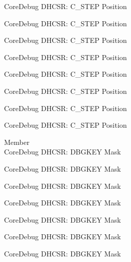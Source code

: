 \begin{DoxyRefList}
\label{deprecated__deprecated000694}%
%
Core\+Debug DHCSR\+: C\+\_\+\+STEP Position 

\label{deprecated__deprecated000782}%
%
Core\+Debug DHCSR\+: C\+\_\+\+STEP Position 

\label{deprecated__deprecated000838}%
%
Core\+Debug DHCSR\+: C\+\_\+\+STEP Position 

\label{deprecated__deprecated000921}%
%
Core\+Debug DHCSR\+: C\+\_\+\+STEP Position 

\label{deprecated__deprecated000980}%
%
Core\+Debug DHCSR\+: C\+\_\+\+STEP Position 

\label{deprecated__deprecated001056}%
%
Core\+Debug DHCSR\+: C\+\_\+\+STEP Position 

\label{deprecated__deprecated001145}%
%
Core\+Debug DHCSR\+: C\+\_\+\+STEP Position 

\label{deprecated__deprecated001247}%
%
Core\+Debug DHCSR\+: C\+\_\+\+STEP Position  
\item[Member \doxylink{group___c_m_s_i_s___core_debug_ga1ce997cee15edaafe4aed77751816ffc}{Core\+Debug\+\_\+\+DHCSR\+\_\+\+DBGKEY\+\_\+\+Msk} ]\hfill \\
\label{deprecated__deprecated000006}%
%
Core\+Debug DHCSR\+: DBGKEY Mask 

\label{deprecated__deprecated000106}%
%
Core\+Debug DHCSR\+: DBGKEY Mask 

\label{deprecated__deprecated000160}%
%
Core\+Debug DHCSR\+: DBGKEY Mask 

\label{deprecated__deprecated000245}%
%
Core\+Debug DHCSR\+: DBGKEY Mask 

\label{deprecated__deprecated000302}%
%
Core\+Debug DHCSR\+: DBGKEY Mask 

\label{deprecated__deprecated000378}%
%
Core\+Debug DHCSR\+: DBGKEY Mask 

\label{deprecated__deprecated000457}%
%
Core\+Debug DHCSR\+: DBGKEY Mask 


\end{DoxyRefList}
